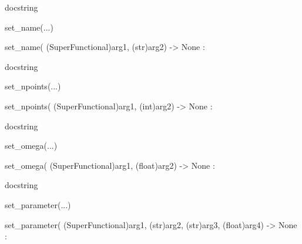 \documentclass[letterpaper,10pt,english]{sphinxmanual}
\begin{document}
\begin{description}
\begin{description}
\begin{DUlineblock}{0em}
\begin{DUlineblock}{\DUlineblockindent}
\begin{DUlineblock}{\DUlineblockindent}
\item[] docstring
\item[] 
\end{DUlineblock}
\end{DUlineblock}
\item[] set\_name(...)
\item[]
\begin{DUlineblock}{\DUlineblockindent}
\item[] set\_name( (SuperFunctional)arg1, (str)arg2) -\textgreater{} None :
\item[]
\begin{DUlineblock}{\DUlineblockindent}
\item[] docstring
\item[] 
\end{DUlineblock}
\end{DUlineblock}
\item[] set\_npoints(...)
\item[]
\begin{DUlineblock}{\DUlineblockindent}
\item[] set\_npoints( (SuperFunctional)arg1, (int)arg2) -\textgreater{} None :
\item[]
\begin{DUlineblock}{\DUlineblockindent}
\item[] docstring
\item[] 
\end{DUlineblock}
\end{DUlineblock}
\item[] set\_omega(...)
\item[]
\begin{DUlineblock}{\DUlineblockindent}
\item[] set\_omega( (SuperFunctional)arg1, (float)arg2) -\textgreater{} None :
\item[]
\begin{DUlineblock}{\DUlineblockindent}
\item[] docstring
\item[] 
\end{DUlineblock}
\end{DUlineblock}
\item[] set\_parameter(...)
\item[]
\begin{DUlineblock}{\DUlineblockindent}
\item[] set\_parameter( (SuperFunctional)arg1, (str)arg2, (str)arg3, (float)arg4) -\textgreater{} None :
\item[]
\begin{DUlineblock}{\DUlineblockindent}

\end{DUlineblock}
\end{DUlineblock}
\end{DUlineblock}
\end{description}
\end{description}
\end{document}
